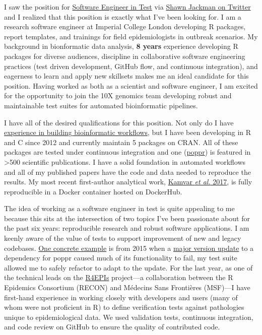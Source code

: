 I saw the position for
\href{https://boards.greenhouse.io/10xgenomics/jobs/1769868?gh_jid=1769868#application}{Software
Engineer in Test} via
\href{https://twitter.com/sjackman/status/1189977010908454912?s=20}{Shawn
Jackman on Twitter} and I realized that this position is exactly what I've been
looking for. I am a research software engineer at Imperial College London
developing R packages, report templates, and trainings for field
epidemiologists in outbreak scenarios. My background in bionformatic data
analysis, \textbf{8 years} experience developing R packages for diverse
audiences, discipline in collaborative software engineering practices (test 
driven development, GitHub flow, and continuous integration), and eagerness to
learn and apply new skillsets makes me an ideal candidate for this position.
Having worked as both as a scientist and software engineer, I am excited for
the opportunity to join the 10X genomics team developing robust and
maintainable test suites for automated bioinformatic pipelines.

\vspace{1ex}

I have all of the desired qualifications for this position. Not only do I have
\href{https://github.com/zkamvar/read-processing}{experience in building
bioinformatic workflows}, but I have been developing in R and C since 2012
and currently maintain 5 packages on CRAN. All of these packages are tested
under continuous integration and one
(\href{https://grunwaldlab.github.io/poppr}{poppr}) is featured in
\textgreater500 scientific publications. I have a solid foundation in automated
workflows and all of my published papers have the code and data needed to
reproduce the results.  My most recent first-author analytical work,
\href{https://peerj.com/articles/4152/}{Kamvar \textit{et al.} 2017}, is fully
reproducible in a Docker container hosted on DockerHub.

\vspace{1ex}

The idea of working as a software engineer in test is quite appealing to me
because this sits at the intersection of two topics I've been passionate about
for the past six years: reproducible research and robust software applications.
I am keenly aware of the value of tests to support improvement of new and
legacy codebases. \href{https://github.com/grunwaldlab/poppr/issues/16}{One
concrete example} is from 2015 when a
\href{https://github.com/thibautjombart/adegenet/commit/add256cd11f37e4865e4278e6bf3ffa81bcd0f63}{major
version update} to a dependency for poppr caused much of its functionality to
fail, my test suite allowed me to safely refactor to adapt to the update. For
the last year, as one of the technical leads on the
\href{https://r4epis.netlify.com}{R4EPIs} project---a collaboration between the
R Epidemics Consortium (RECON) and M\'{e}decins Sans Fronti\`{e}res (MSF)---I
have first-hand experience in working closely with developers and users (many
of whom were not proficient in R) to define verification tests against
pathologies unique to epidemiological data. We used validation tests,
continuous integration, and code review on GitHub to ensure the quality of
contributed code.

